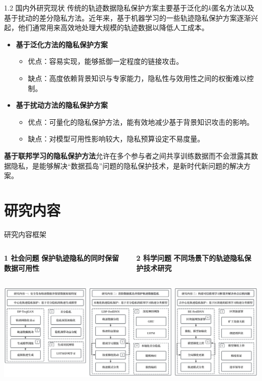 \documentclass{sintefbeamer}
\begin{document}
\begin{frame}{1.2 国内外研究现状}
传统的轨迹数据隐私保护方案主要基于泛化的$k$匿名方法以及基于扰动的差分隐私方法。近年来，基于机器学习的一些轨迹隐私保护方案逐渐兴起，他们通常用来高效地处理大规模的轨迹数据以降低人工成本。
\begin{itemize}
\item \textbf{基于泛化方法的隐私保护方案}
  \begin{itemize}
  \item 优点：容易实现，能够抵御一定程度的链接攻击。
  \item 缺点：高度依赖背景知识与专家能力，隐私性与效用性之间的权衡难以控制。
  \end{itemize}
\item \textbf{基于扰动方法的隐私保护方案}
  \begin{itemize}
  \item 优点：可量化的隐私保护方法，能有效地减少基于背景知识攻击的影响。
  \item 缺点：对模型可用性影响较大，隐私预算设定不易度量。
  \end{itemize}
\end{itemize}
\textbf{基于联邦学习的隐私保护方法}允许在多个参与者之间共享训练数据而不会泄露其数据隐私，是能够解决“数据孤岛”问题的隐私保护技术，是新时代新问题的解决方案。
\end{frame}

\section{研究内容}

\begin{frame}{研究内容框架}

\begin{columns}
\begin{column}{0.5\textwidth}
\vspace*{-0.4cm} \begin{block}{\textbf{1 社会问题}}\centering
\textbf{保护轨迹隐私的同时保留数据可用性}
\end{block}
\end{column}
\begin{column}{0.5\textwidth}
\vspace*{-0.4cm} \begin{block}{\textbf{2 科学问题}}\centering
\textbf{不同场景下的轨迹隐私保护技术研究}
\end{block}
\end{column}
\end{columns}

\vspace*{0.2cm} \hspace*{-0.7cm} \includegraphics[width=1.1\textwidth]{images/content}
\end{frame}
\end{document}
